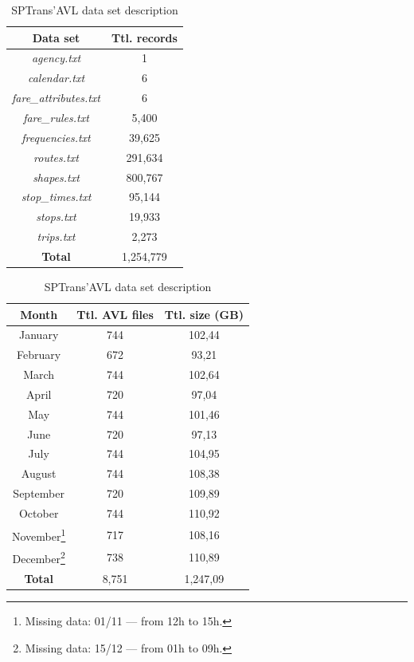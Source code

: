 \documentclass[runningheads]{llncs}
\begin{document}
\begin{table}[!htb]
    \begin{minipage}{.45\linewidth}
      \caption{Data set and total records specified in SPTrans' GTFS}
      \centering
      \label {tab:gtfs}
\begin {tabular} {c | c}
\toprule
\textbf{Data set} & \textbf {Ttl. records} \\
\midrule
\textit{agency.txt} & 1 \\
\hline
\textit{calendar.txt} & 6 \\
\hline
\textit{fare\_attributes.txt} & 6 \\
\hline
\textit{fare\_rules.txt} & 5,400 \\
\hline
\textit{frequencies.txt} & 39,625 \\
\hline
\textit{routes.txt} & 291,634 \\
\hline
\textit{shapes.txt} & 800,767 \\
\hline
\textit{stop\_times.txt} & 95,144 \\
\hline
\textit{stops.txt} & 19,933 \\
\hline
\textit{trips.txt} & 2,273 \\
\midrule
\textbf{Total} & 1,254,779 \\
\bottomrule
\end {tabular}
    \end{minipage}%
    \begin{minipage}{.45\linewidth}
      \centering
        \caption{SPTrans'AVL data set description}
        \label{tab:avlDataset}
\begin{tabular}{ c | c | c}
\toprule
\textbf{Month} & \textbf{Ttl. AVL files} & \textbf{Ttl. size (GB)}\\
\midrule
January & 744 & 102,44 \\
\hline
 February & 672 & 93,21 \\
\hline
 March & 744 & 102,64 \\
\hline
 April & 720 & 97,04 \\
\hline
 May & 744 & 101,46 \\
\hline
 June & 720 & 97,13 \\
\hline
 July & 744 & 104,95 \\
\hline
 August &  744 & 108,38 \\
\hline
 September & 720 & 109,89 \\
\hline
 October & 744 & 110,92 \\
\hline
 November\footnote{Missing data: 01/11 --- from 12h to 15h.} & 717 & 108,16 \\
\hline
 December\footnote{Missing data: 15/12 --- from 01h to 09h.} & 738 & 110,89 \\
\midrule
\textbf{Total} & 8,751 & 1,247,09 \\
\bottomrule
\end{tabular}
    \end{minipage} 
\end{table}
\end{document}
